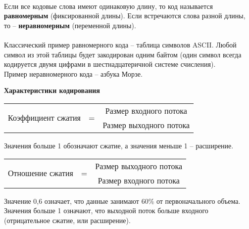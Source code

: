 \\Если все кодовые слова имеют одинаковую длину, то код называется \textbf{равномерным} (фиксированной длины). Если встречаются слова разной длины, то -- \textbf{неравномерным} (переменной длины).
\\
\\Классический пример равномерного кода -- таблица символов ASCII. Любой символ из этой таблицы будет закодирован одним байтом (один символ всегда кодируется двумя цифрами в шестнадцатеричной системе счисления).
\\Пример неравномерного кода -- азбука Морзе.
\\
\begin{center}
  \textbf{Характеристики кодирования}
\end{center}
\begin{table}[h]
\begin{center}
\begin{tabular}{c c c}
\multirow{2}{*}{Коэффициент сжатия} & \multirow{2}{*}{ = }  & Размер входного потока  \\
\hhline{~~-}
 &  & Размер выходного потока
\end{tabular}
\end{center}
Значения больше 1 обозначают сжатие, а значения меньше 1 – расширение.
\end{table}
\begin{table}[h]
\begin{center}
\begin{tabular}{c c c}
\multirow{2}{*}{Отношение сжатия} & \multirow{2}{*}{ = }  & Размер выходного потока  \\
\hhline{~~-}
 &  & Размер входного потока
\end{tabular}
\end{center}
Значение 0,6 означает, что данные занимают 60\% от первоначального объема. Значения больше 1 означают, что выходной поток больше входного (отрицательное сжатие, или расширение).
\end{table}

